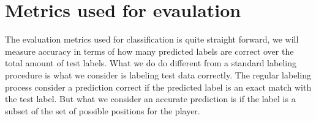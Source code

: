 \section{Metrics used for evaulation}

The evaluation metrics used for classification is quite straight forward, we will measure accuracy in terms of how many predicted labels are correct over the total amount of test labels. What we do do different from a standard labeling procedure is what we consider is labeling test data correctly. The regular labeling process consider a prediction correct if the predicted label is an exact match with the test label. But what we consider an accurate prediction is if the label is a subset of the set of possible positions for the player.